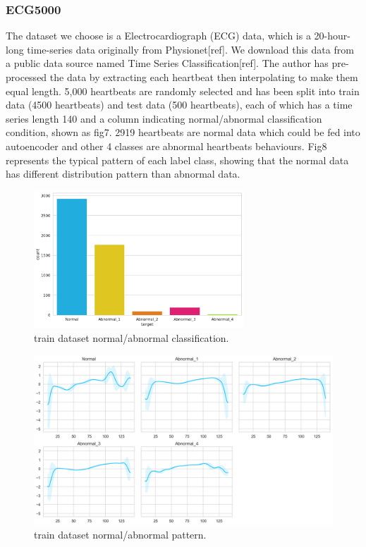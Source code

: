 \documentclass{article}
\begin{document}
\subsubsection{ECG5000}
The dataset we choose is a Electrocardiograph (ECG) data, which is a 20-hour-long time-series data originally from Physionet[ref]. We download this data from a public data source named Time Series Classification[ref]. The author has pre-processed the data by extracting each heartbeat then interpolating to make them equal length. 5,000 heartbeats are randomly selected and has been split into train data (4500 heartbeats) and test data (500 heartbeats), each of which has a time series length 140 and a column indicating normal/abnormal classification condition, shown as fig7. 2919 heartbeats are normal data which could be fed into autoencoder and other 4 classes are abnormal heartbeats behaviours. Fig8 represents the typical pattern of each label class, showing that the normal data has different distribution pattern than abnormal data.  
\begin{figure}[!t]
    \centering
    \includegraphics[width=0.7\textwidth]{images/download.png}
    \caption{train dataset normal/abnormal classification.}
\end{figure}
\begin{figure}[!t]
    \centering
    \includegraphics[width=1\textwidth]{images/download (1).png}
    \caption{train dataset normal/abnormal pattern.}
\end{figure}
\end{document}
